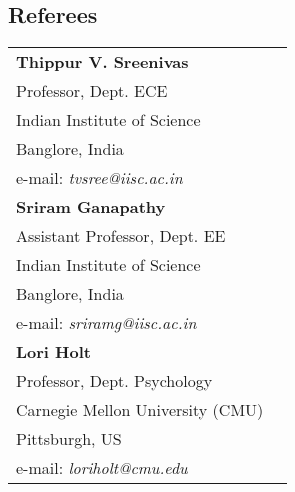 \documentclass[line]{resume}
\begin{document}
{\begin{resume}
\section{\mysidestyle Referees} 
\vspace{-5.5mm}
\begin{tabular}{@{}p{6cm}p{6cm}}
\vspace{6mm}
\textbf{Thippur V. Sreenivas}                         \\
Professor, Dept. ECE                                            \\
Indian Institute of Science                                     \\
Banglore, India                                                 \\
e-mail: \textsl{tvsree@iisc.ac.in}  \\


\vspace{6mm}
\textbf{Sriram Ganapathy}                         \\
Assistant Professor, Dept. EE                                   \\
Indian Institute of Science                                     \\
Banglore, India                                                 \\
e-mail: \textsl{sriramg@iisc.ac.in}    \\

\vspace{6mm}
\textbf{Lori Holt}                         \\
Professor, Dept. Psychology                                   \\
Carnegie Mellon University (CMU)                                \\
Pittsburgh, US                                                 \\
e-mail: \textsl{loriholt@cmu.edu}    \\



\end{tabular}
\end{resume}}
\end{document}
